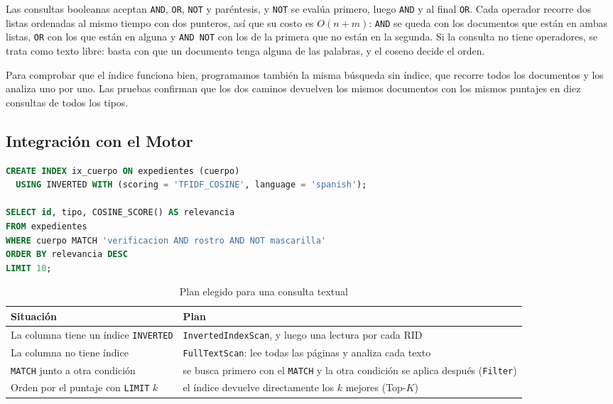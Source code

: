 Las consultas booleanas aceptan \texttt{AND}, \texttt{OR}, \texttt{NOT} y
paréntesis, y \texttt{NOT} se evalúa primero, luego \texttt{AND} y al final
\texttt{OR}. Cada operador recorre dos listas ordenadas al mismo tiempo con dos
punteros, así que su costo es $O(n + m)$: \texttt{AND} se queda con los
documentos que están en ambas listas, \texttt{OR} con los que están en alguna y
\texttt{AND NOT} con los de la primera que no están en la segunda. Si la
consulta no tiene operadores, se trata como texto libre: basta con que un
documento tenga alguna de las palabras, y el coseno decide el orden.

Para comprobar que el índice funciona bien, programamos también la misma
búsqueda sin índice, que recorre todos los documentos y los analiza uno por
uno. Las pruebas confirman que los dos caminos devuelven los mismos documentos
con los mismos puntajes en diez consultas de todos los tipos.

\subsection{Integración con el Motor}

\begin{lstlisting}[language=SQL, caption={Índice invertido y consulta textual}]
CREATE INDEX ix_cuerpo ON expedientes (cuerpo)
  USING INVERTED WITH (scoring = 'TFIDF_COSINE', language = 'spanish');

SELECT id, tipo, COSINE_SCORE() AS relevancia
FROM expedientes
WHERE cuerpo MATCH 'verificacion AND rostro AND NOT mascarilla'
ORDER BY relevancia DESC
LIMIT 10;
\end{lstlisting}

\begin{table}[H]
\centering
\caption{Plan elegido para una consulta textual}
\begin{tabularx}{\textwidth}{@{}lX@{}}
\toprule
\textbf{Situación} & \textbf{Plan} \\
\midrule
La columna tiene un índice \texttt{INVERTED} & \texttt{InvertedIndexScan}, y luego una lectura por cada RID \\
La columna no tiene índice & \texttt{FullTextScan}: lee todas las páginas y analiza cada texto \\
\texttt{MATCH} junto a otra condición & se busca primero con el \texttt{MATCH} y la otra condición se aplica después (\texttt{Filter}) \\
Orden por el puntaje con \texttt{LIMIT} $k$ & el índice devuelve directamente los $k$ mejores (Top-$K$) \\
\bottomrule
\end{tabularx}
\end{table}

